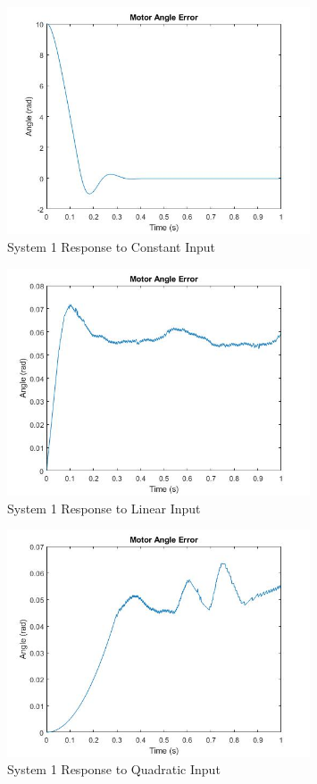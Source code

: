 \begin{figure}[H]
        \centering
        \includegraphics[width=0.8\textwidth]{./figures/lab4_fig7-part4-3-3-error-rc5.jpg}
        \caption{System 1 Response to Constant Input}
        \label{fig:system1_constant}
\end{figure}

\begin{figure}[H]
        \centering
        \includegraphics[width=0.8\textwidth]{./figures/lab4_fig8-part4-3-3-error-rc5-linear.jpg}
        \caption{System 1 Response to Linear Input}
        \label{fig:system1_linear}
\end{figure}

\begin{figure}[H]
        \centering
        \includegraphics[width=0.8\textwidth]{./figures/lab4_fig9-part4-3-3-error-rc5-quadratic.jpg}
        \caption{System 1 Response to Quadratic Input}
        \label{fig:system1_quadratic}
\end{figure}

